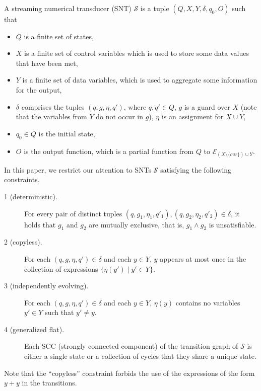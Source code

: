 \documentclass[runningheads,a4paper]{llncs}
\def\Ee{{\mathcal{E} }}
\def\Nn{{\mathbb{N} }}
\def\Ss{{\mathcal{S} }}
\newcommand{\zhilin}[1]{\color{cyan} {ZL: #1 :LZ} \color{black}}
\newcommand{\lei}[1]{\color{green} {LE: #1 :EL} \color{black}}
\begin{document}
A streaming numerical transducer (SNT) $\Ss$ is a tuple $(Q, X, Y, \delta, q_0, O)$ such that 
\begin{itemize}
\item $Q$ is a finite set of states,
\item $X$ is a finite set of control variables which is used to store some data values that have been met,
\item $Y$ is a finite set of data variables, which is used to aggregate some information for the output,
\item $\delta$ comprises the tuples $(q,  g, \eta, q')$, where $q,q'\in Q$, $g$ is a guard over $X$ (note that the variables from $Y$ do not occur in $g$), $\eta$ is an assignment for $X \cup Y$, 
\item $q_0 \in Q$ is the initial state,
\item $O$ is the output function, which is a partial function from $Q$ to $\Ee_{(X \setminus \{cur\}) \cup Y}$.
\end{itemize}


In this paper, we restrict our attention to SNTs $\Ss$ satisfying the following constraints.
\begin{description}
\item [1 (deterministic).] For every pair of distinct tuples $(q, g_1, \eta_1,q'_1), (q, g_2,\eta_2,q'_2) \in \delta$, it holds that $g_1$ and $g_2$ are mutually exclusive, that is, $g_1 \wedge g_2$ is unsatisfiable.
%
\item[2 (copyless).] For each $(q, g, \eta, q') \in \delta$ and each $y \in Y$, $y$ appears at most once in the collection of expressions $\{\eta(y') \mid y' \in Y\}$.
%
\item[3 (independently evolving).] For each $(q, g, \eta, q') \in \delta$ and each $y \in Y$, $\eta(y)$ contains no variables $y' \in Y$ such that $y' \neq y$.
%
\item [4 (generalized flat).] Each SCC (strongly connected component) of the transition graph of $\Ss$ is either a single state or a collection of cycles that they share a unique state.
\end{description}
Note that the ``copyless'' constraint forbids the use of the expressions of the form $y+y$ in the transitions.
\end{document}
